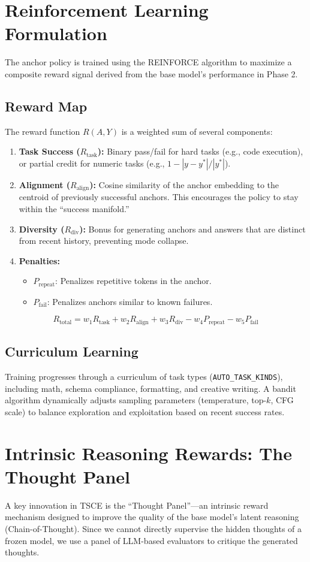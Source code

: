 \documentclass[11pt]{article}
\begin{document}
\section{Reinforcement Learning Formulation}
The anchor policy is trained using the REINFORCE algorithm to maximize a composite reward signal derived from the base model's performance in Phase 2.

\subsection{Reward Map}
The reward function $R(A, Y)$ is a weighted sum of several components:
\begin{enumerate}
    \item \textbf{Task Success ($R_{\text{task}}$):} Binary pass/fail for hard tasks (e.g., code execution), or partial credit for numeric tasks (e.g., $1 - |y - y^*|/|y^*|$).
    \item \textbf{Alignment ($R_{\text{align}}$):} Cosine similarity of the anchor embedding to the centroid of previously successful anchors. This encourages the policy to stay within the ``success manifold.''
    \item \textbf{Diversity ($R_{\text{div}}$):} Bonus for generating anchors and answers that are distinct from recent history, preventing mode collapse.
    \item \textbf{Penalties:}
    \begin{itemize}
        \item $P_{\text{repeat}}$: Penalizes repetitive tokens in the anchor.
        \item $P_{\text{fail}}$: Penalizes anchors similar to known failures.
    \end{itemize}
\end{enumerate}
\[ R_{\text{total}} = w_1 R_{\text{task}} + w_2 R_{\text{align}} + w_3 R_{\text{div}} - w_4 P_{\text{repeat}} - w_5 P_{\text{fail}} \]

\subsection{Curriculum Learning}
Training progresses through a curriculum of task types (\texttt{AUTO\_TASK\_KINDS}), including math, schema compliance, formatting, and creative writing. A bandit algorithm dynamically adjusts sampling parameters (temperature, top-$k$, CFG scale) to balance exploration and exploitation based on recent success rates.

\section{Intrinsic Reasoning Rewards: The Thought Panel}
A key innovation in TSCE is the ``Thought Panel''---an intrinsic reward mechanism designed to improve the quality of the base model's latent reasoning (Chain-of-Thought). Since we cannot directly supervise the hidden thoughts of a frozen model, we use a panel of LLM-based evaluators to critique the generated thoughts.
\end{document}
